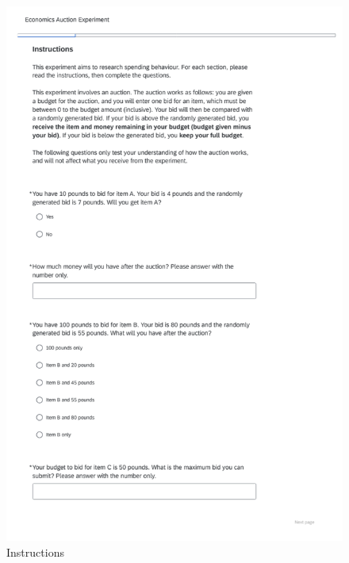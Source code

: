 \documentclass[
]{report}
\begin{document}
\begin{figure}[H]

{\centering \includegraphics{experiment_instructions/instructions.png}

}

\caption{Instructions}

\end{figure}%
\end{document}
